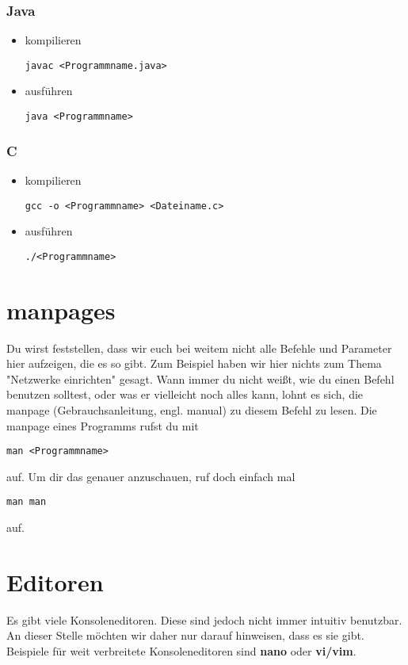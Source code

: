 \documentclass[a4paper,10pt]{article}
\begin{document}
\subsubsection{Java}
\begin{itemize}
\item kompilieren 
\begin{lstlisting}
javac <Programmname.java>
\end{lstlisting} 
\item ausführen
\begin{lstlisting}
java <Programmname>
\end{lstlisting} 
\end{itemize}

\subsubsection{C}
\begin{itemize}
\item kompilieren
\begin{lstlisting}
gcc -o <Programmname> <Dateiname.c>
\end{lstlisting} 
\item ausführen
\begin{lstlisting}
./<Programmname>
\end{lstlisting} 
\end{itemize}

\section{manpages}
Du wirst feststellen, dass wir euch bei weitem nicht alle Befehle und 
Parameter hier aufzeigen, die es so gibt. Zum Beispiel haben wir hier 
nichts zum Thema "Netzwerke einrichten" gesagt. Wann immer du nicht 
weißt, wie du einen Befehl benutzen solltest, oder was er vielleicht 
noch alles kann, lohnt es sich, die manpage (Gebrauchsanleitung, engl. 
manual) zu diesem Befehl zu lesen. Die manpage eines Programms rufst du 
mit 
\begin{lstlisting}
man <Programmname>
\end{lstlisting} 
 auf. Um dir das genauer anzuschauen, ruf doch einfach mal 
\begin{lstlisting}
man man
\end{lstlisting} 
auf.

\section{Editoren}
Es gibt viele Konsoleneditoren. Diese sind jedoch nicht immer intuitiv 
benutzbar. An dieser Stelle möchten wir daher nur darauf hinweisen, dass 
es sie gibt. Beispiele für weit verbreitete Konsoleneditoren sind 
\textbf{nano} oder \textbf{vi/vim}.
\end{document}
